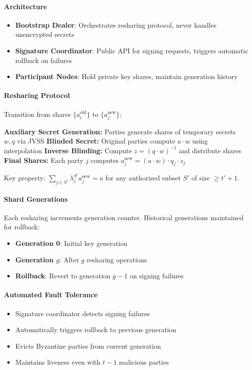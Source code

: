 \documentclass[11pt,twocolumn]{article}
\begin{document}
\paragraph{Architecture}
\begin{itemize}
\item \textbf{Bootstrap Dealer}: Orchestrates resharing protocol, never handles unencrypted secrets
\item \textbf{Signature Coordinator}: Public API for signing requests, triggers automatic rollback on failures
\item \textbf{Participant Nodes}: Hold private key shares, maintain generation history
\end{itemize}

\paragraph{Resharing Protocol} Transition from shares $\{a_i^{\text{old}}\}$ to $\{a_j^{\text{new}}\}$:
\begin{algorithmic}[1]
\State \textbf{Auxiliary Secret Generation:} Parties generate shares of temporary secrets $w, q$ via JVSS
\State \textbf{Blinded Secret:} Original parties compute $a \cdot w$ using interpolation
\State \textbf{Inverse Blinding:} Compute $z = (q \cdot w)^{-1}$ and distribute shares
\State \textbf{Final Shares:} Each party $j$ computes $a_j^{\text{new}} = (a \cdot w) \cdot q_j \cdot z_j$
\end{algorithmic}

Key property: $\sum_{j \in S'} \lambda_j^{S'} a_j^{\text{new}} = a$ for any authorized subset $S'$ of size $\geq t'+1$.

\paragraph{Shard Generations} Each resharing increments generation counter. Historical generations maintained for rollback:
\begin{itemize}
\item \textbf{Generation 0}: Initial key generation
\item \textbf{Generation $g$}: After $g$ resharing operations
\item \textbf{Rollback}: Revert to generation $g-1$ on signing failures
\end{itemize}

\paragraph{Automated Fault Tolerance}
\begin{itemize}
\item Signature coordinator detects signing failures
\item Automatically triggers rollback to previous generation
\item Evicts Byzantine parties from current generation
\item Maintains liveness even with $t-1$ malicious parties
\end{itemize}
\end{document}
